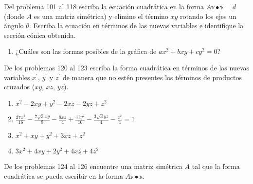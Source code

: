 Del problema 101 al 118 escriba la ecuación cuadrática en la forma $A \mathbb{v} \bullet \mathbb{v}=d$ (donde $A$ es una matriz simétrica) y elimine el término $x y$ rotando los ejes un ángulo $\theta$. Escriba la ecuación en términos de las nuevas variables e identifique la sección cónica obtenida.
\begin{multienumerate}
    \setcounter{multienumi}{100}
\end{multienumerate}
\begin{enumerate}[start=119]
    \item ¿Cuáles son las formas posibles de la gráfica de $a x^{2}+b x y+c y^{2}=0$?
\end{enumerate}
De los problemas 120 al 123 escriba la forma cuadrática en términos de las nuevas variables $x^{\prime}$, $y^{\prime}$ y $z^{\prime}$ de manera que no estén presentes los términos de productos cruzados ($x y$, $x z$, $y z$).
\begin{enumerate}[resume]
    \item $x^{2}-2 x y+y^{2}-2 x z-2 y z+z^{2}$
    \item $\displaystyle\frac{27 x^{2}}{16}-\frac{7 \sqrt{3} x y}{8}-\frac{9 x z}{4}+\frac{41 y^{2}}{16}-\frac{3 \sqrt{3} y z}{4}-\frac{z^{2}}{4}=1$
    \item $x^{2}+x y+y^{2}+3 x z+z^{2}$
    \item $3 x^{2}+4 x y+2 y^{2}+4 x z+4 z^{2}$
\end{enumerate}
De los problemas 124 al 126 encuentre una matriz simétrica $A$ tal que la forma cuadrática se pueda escribir en la forma $A \mathbb{x} \bullet \mathbb{x}$.

